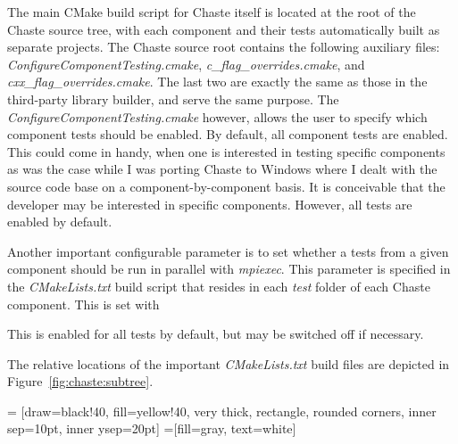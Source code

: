 \documentclass[10pt,a4paper]{article}
\begin{document}
The main CMake build script for Chaste itself is located at the root of the
Chaste source tree, with each component and their tests automatically built as
separate projects. The Chaste source root contains the following auxiliary
files: \textit{ConfigureComponentTesting.cmake},
\textit{c\_flag\_overrides.cmake}, and \textit{cxx\_flag\_overrides.cmake}. The
last two are exactly the same as those in the third-party library builder, and
serve the same purpose. The \textit{ConfigureComponentTesting.cmake} however,
allows the user to specify which component tests should be enabled. By default,
all component tests are enabled. This could come in handy, when one is
interested in testing specific components as was the case while I was porting
Chaste to Windows where I dealt with the source code base on a
component-by-component basis. It is conceivable that the developer may be
interested in specific components. However, all tests are enabled by default.

Another important configurable parameter is to set whether a tests from a given
component should be run in parallel with \textit{mpiexec}. This parameter is
specified in the \textit{CMakeLists.txt} build script that resides in each
\textit{test} folder of each Chaste component. This is set with
\begin{center}
\end{center}
This is enabled for all tests by default, but may be switched off if necessary.

The relative locations of the important \textit{CMakeLists.txt} build files are
depicted in Figure~\ref{fig:chaste:subtree}.


 = [draw=black!40, fill=yellow!40, very thick,
    rectangle, rounded corners, inner sep=10pt, inner ysep=20pt]
 =[fill=gray, text=white]
\end{document}
